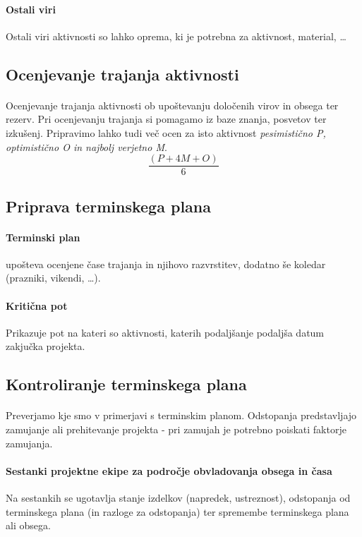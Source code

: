 \documentclass[a4paper,12pt]{report}
\begin{document}
         \paragraph{Ostali viri} Ostali viri aktivnosti so lahko oprema, ki je potrebna za aktivnost, material, \dots
      \subsection{Ocenjevanje trajanja aktivnosti}
         \paragraph{} Ocenjevanje trajanja aktivnosti ob upoštevanju določenih virov in obsega ter rezerv. Pri ocenjevanju trajanja si pomagamo iz baze znanja, posvetov ter izkušenj. Pripravimo lahko tudi več ocen za isto aktivnost \emph{pesimistično P, optimistično O in najbolj verjetno M}.
            \[ \frac{(P + 4M + O)}{6} \]
      \subsection{Priprava terminskega plana}
         \paragraph{Terminski plan} upošteva ocenjene čase trajanja in njihovo razvrstitev, dodatno še koledar (prazniki, vikendi, \dots).
         \paragraph{Kritična pot} Prikazuje pot na kateri so aktivnosti, katerih podaljšanje podaljša datum zakjučka projekta.
      \subsection{Kontroliranje terminskega plana}
         \paragraph{} Preverjamo kje smo v primerjavi s terminskim planom. Odstopanja predstavljajo zamujanje ali prehitevanje projekta - pri zamujah je potrebno poiskati faktorje zamujanja.
         \paragraph{Sestanki projektne ekipe za področje obvladovanja obsega in časa} Na sestankih se ugotavlja stanje izdelkov (napredek, ustreznost), odstopanja od terminskega plana (in razloge za odstopanja) ter spremembe terminskega plana ali obsega.
\end{document}
